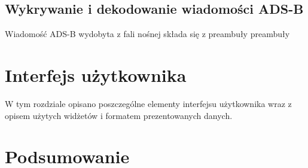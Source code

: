 \documentclass[eng,printmode]{mgr}
\begin{document}
\section{Wykrywanie i dekodowanie wiadomości ADS-B}

Wiadomość ADS-B wydobyta z fali nośnej składa się z preambuły preambuły 


\chapter{Interfejs użytkownika}
W tym rozdziale opisano poszczególne elementy interfejsu użytkownika wraz z opisem użytych widżetów i formatem prezentowanych danych.

\chapter{ Podsumowanie }


\end{document}
